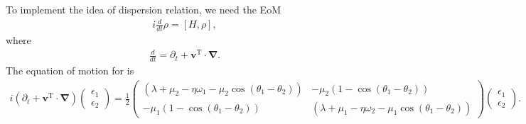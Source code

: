 \documentclass[letterpaper,12pt,english]{sphinxmanual}
\begin{document}
To implement the idea of dispersion relation, we need the EoM
\begin{equation*}
\begin{split}i\frac{d}{dt}\rho = [H,\rho],\end{split}
\end{equation*}
where
\begin{equation*}
\begin{split}\frac{d}{dt} = \partial_t + \mathbf v^{\mathrm T} \cdot \boldsymbol \nabla.\end{split}
\end{equation*}
The equation of motion for {\hyperref[\detokenize{collective/some-clarifications:two-beams-model}]{}} is
\label{\detokenize{collective/directional-instability:equation-eqn-line-model-two-beams-linearized-eom-liouville}}\begin{equation}\label{equation:collective/directional-instability:eqn-line-model-two-beams-linearized-eom-liouville}
\begin{split}i (\partial_t+\mathbf v^{\mathrm T}\cdot\boldsymbol\nabla) \begin{pmatrix}
\epsilon_1 \\
\epsilon_2
\end{pmatrix} =
\frac{1}{2}\begin{pmatrix}
(\lambda+ \mu_2 - \eta \omega_1 - \mu_2 \cos(\theta_1-\theta_2) ) & -\mu_2 (1-\cos(\theta_1-\theta_2)) \\
-\mu_1 (1- \cos(\theta_1-\theta_2)) & (\lambda + \mu_1 - \eta \omega_2 - \mu_1 \cos(\theta_1-\theta_2) )
\end{pmatrix}\begin{pmatrix}
\epsilon_1 \\
\epsilon_2
\end{pmatrix}.\end{split}
\end{equation}
\end{document}
